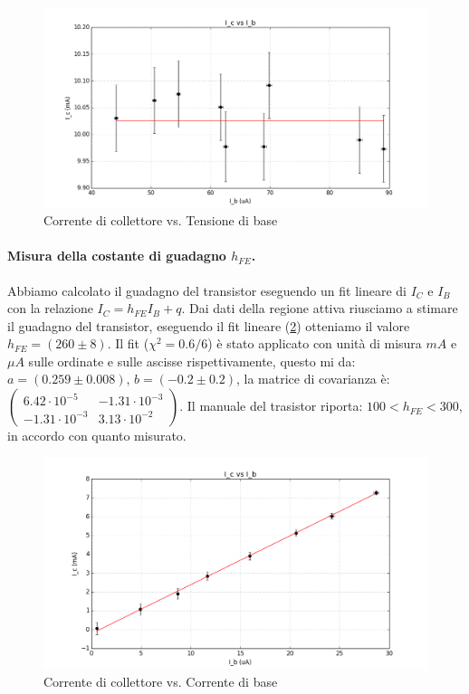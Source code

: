 \documentclass[10pt,a4paper]{article}
\begin{document}
\begin{figure}[!htb]
  \centering
  \includegraphics[scale=0.5]{fitSaturazione.png} 
\caption{Corrente di collettore vs. Tensione di base} \label{saturazione}
\end{figure}


\paragraph{Misura della costante di guadagno $h_{FE}$.}
Abbiamo calcolato il guadagno del transistor eseguendo un fit lineare di $I_C$ e $I_B$ con la  relazione $I_C=h_{FE}I_B+q$.
Dai dati della regione attiva riusciamo a stimare il guadagno del transistor, eseguendo il fit lineare (\ref{guadagno}) otteniamo il valore $h_{FE} = (260 \pm 8)$. Il fit ($\chi^2 = 0.6/6$) è stato applicato con unità di misura $mA$ e $\mu A$ sulle ordinate e sulle ascisse rispettivamente, questo mi da:
$a = (0.259 \pm 0.008)$, $b = (-0.2 \pm 0.2)$, la matrice di covarianza è: $\left(
\begin{array}{cc}
6.42 \cdot 10^{-5} & -1.31 \cdot 10^{-3} \\ 
-1.31 \cdot 10^{-3} & 3.13 \cdot 10^{-2}
\end{array}   
\right)$.
Il manuale del trasistor riporta: $100 < h_{FE} < 300$, in accordo con quanto misurato.

\begin{figure}[!htb]
  \centering
  \includegraphics[scale=0.5]{rettaGuadagno.png} 
\caption{Corrente di collettore vs. Corrente di base} \label{guadagno}
\end{figure}
\end{document}
